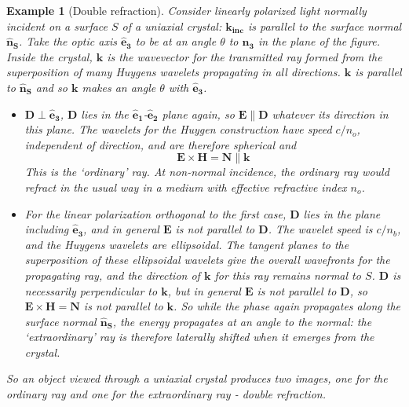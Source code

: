 \documentclass[a4paper]{article}
\newtheorem{eg}{Example}[section]
\theoremstyle{new}
\begin{document}
\begin{eg}[Double refraction]
Consider linearly polarized light normally incident on a surface $S$ of a uniaxial crystal: $\mathbf{k_{inc}}$ is parallel to the surface normal $\mathbf{\hat{n}_S}$. Take the optic axis $\mathbf{\hat{e}_3}$ to be at an angle $\theta$ to $\mathbf{\hat{n}_3}$ in the plane of the figure. Inside the crystal, $\mathbf{k}$ is the wavevector for the transmitted ray formed from the superposition of many Huygens wavelets propagating in all directions. $\mathbf{k}$ is parallel to $\mathbf{\hat{n}_S}$ and so $\mathbf{k}$ makes an angle $\theta$ with $\mathbf{\hat{e}_3}$.
\begin{itemize}
    \item $\mathbf{D}\perp\mathbf{\hat{e}_3}$, $\mathbf{D}$ lies in the $\mathbf{\hat{e}_1}$-$\mathbf{\hat{e}_2}$ plane again, so $\mathbf{E}\parallel\mathbf{D}$ whatever its direction in this plane. The wavelets for the Huygen construction have speed $c/n_o$, independent of direction, and are therefore spherical and
    $$\mathbf{E}\times\mathbf{H}=\mathbf{N}\parallel\mathbf{k}$$
    This is the `ordinary' ray. At non-normal incidence, the ordinary ray would refract in the usual way in a medium with effective refractive index $n_o$.
    \item For the linear polarization orthogonal to the first case, $\mathbf{D}$ lies in the plane including $\mathbf{\hat{e}_3}$, and in general $\mathbf{E}$ is not parallel to $\mathbf{D}$. The wavelet speed is $c/n_b$, and the Huygens wavelets are ellipsoidal. The tangent planes to the superposition of these ellipsoidal wavelets give the overall wavefronts for the propagating ray, and the direction of $\mathbf{k}$ for this ray remains normal to $S$. $\mathbf{D}$ is necessarily perpendicular to $\mathbf{k}$, but in general $\mathbf{E}$ is not parallel to $\mathbf{D}$, so $\mathbf{E}\times\mathbf{H}=\mathbf{N}$ is not parallel to $\mathbf{k}$. So while the phase again propagates along the surface normal $\mathbf{\hat{n}_S}$, the energy propagates at an angle to the normal: the `extraordinary' ray is therefore laterally shifted when it emerges from the crystal.
\end{itemize}
So an object viewed through a uniaxial crystal produces two images, one for the ordinary ray and one for the extraordinary ray - double refraction.
\end{eg}
\end{document}
